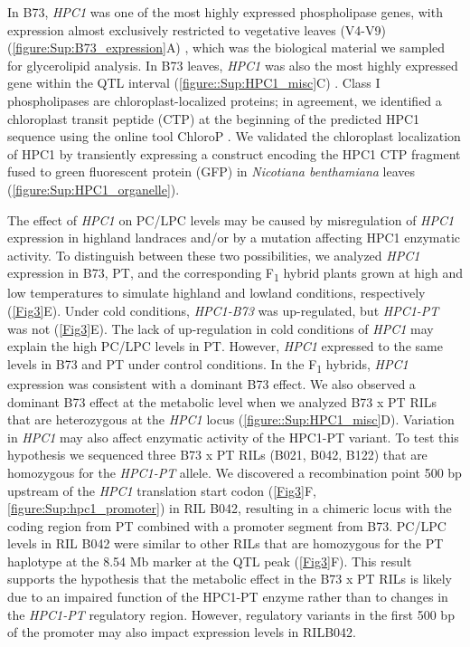 \documentclass[9pt,twocolumn,twoside,lineno]{biorxiv}
\newcommand{\hpc}{\textit{HPC1}\xspace}
\begin{document}
In B73, \hpc was one of the most highly expressed phospholipase genes, with expression almost exclusively restricted to vegetative leaves (V4-V9) (\cref{figure:Sup:B73_expression}A) \cite{Stelpflug2016-vr}, which was the biological material we sampled for glycerolipid analysis. 
In B73 leaves, \hpc was also the most highly expressed gene within the QTL interval (\cref{figure::Sup:HPC1_misc}C) \cite{Stelpflug2016-vr}.
Class I phospholipases are chloroplast-localized proteins; in agreement, we identified a chloroplast transit peptide (CTP) at the beginning of the predicted HPC1 sequence using the online tool ChloroP \cite{Emanuelsson1999-rs}.
We validated the chloroplast localization of HPC1 by transiently expressing a construct encoding the HPC1 CTP fragment fused to green fluorescent protein (GFP) in \textit{Nicotiana benthamiana} leaves (\cref{figure:Sup:HPC1_organelle}).

The effect of \hpc on PC/LPC levels may be caused by misregulation of \hpc expression in highland landraces and/or by a mutation affecting HPC1 enzymatic activity. 
To distinguish between these two possibilities, we analyzed \hpc expression in B73, PT, and the corresponding F\textsubscript{1} hybrid plants grown at high and low temperatures to simulate highland and lowland conditions, respectively (\cref{Fig3}E). 
Under cold conditions, \textit{HPC1-B73} was up-regulated, but \textit{HPC1-PT} was not (\cref{Fig3}E). 
The lack of up-regulation in cold conditions of \hpc may explain the high PC/LPC levels in PT.
However, \hpc expressed to the same levels in B73 and PT under control conditions.
In the F\textsubscript{1} hybrids, \hpc expression was consistent with a dominant B73 effect.
We also observed a dominant B73 effect at the metabolic level when we analyzed B73 x PT RILs that are heterozygous at the \hpc locus
(\cref{figure::Sup:HPC1_misc}D).
Variation in \hpc may also affect enzymatic activity of the HPC1-PT variant. 
To test this hypothesis we sequenced three B73 x PT RILs (B021, B042, B122) that are homozygous for the \textit{HPC1-PT} allele.
We discovered a recombination point 500 bp upstream of the \hpc translation start codon (\cref{Fig3}F, \cref{figure:Sup:hpc1_promoter}) in RIL B042, resulting in a chimeric locus with the coding region from PT combined with a promoter segment from B73.
PC/LPC levels in RIL B042 were similar to other RILs that are homozygous for the PT haplotype at the 8.54 Mb marker at the QTL peak (\cref{Fig3}F). 
This result supports the hypothesis that the metabolic effect in the B73 x PT RILs is likely due to an impaired function of the HPC1-PT enzyme rather than to changes in the \textit{HPC1-PT} regulatory region.
However, regulatory variants in the first 500 bp of the promoter may also impact expression levels in RILB042.
\end{document}
